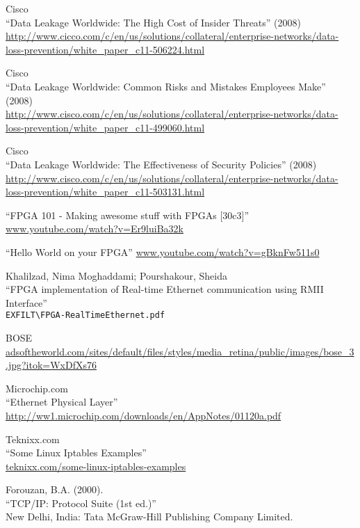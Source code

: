 \begin{thebibliography}{99}
{}
 Cisco \\
``Data Leakage Worldwide: The High Cost of Insider Threats'' (2008)\\
\url{http://www.cicco.com/c/en/us/solutions/collateral/enterprise-networks/data-loss-prevention/white_paper_c11-506224.html}

 Cisco\\
``Data Leakage Worldwide: Common Risks and Mistakes Employees Make'' (2008)\\
\url{http://www.cisco.com/c/en/us/solutions/collateral/enterprise-networks/data-loss-prevention/white_paper_c11-499060.html}

 Cisco\\
``Data Leakage Worldwide: The Effectiveness of Security Policies'' (2008)\\
\url{http://www.cisco.com/c/en/us/solutions/collateral/enterprise-networks/data-loss-prevention/white_paper_c11-503131.html}

 ``FPGA 101 - Making awesome stuff with FPGAs [30c3]''\\
\url{www.youtube.com/watch?v=Er9luiBa32k}

 ``Hello World on your FPGA''
\url{www.youtube.com/watch?v=gBknFw511s0}

 Khalilzad, Nima Moghaddami; Pourshakour, Sheida\\
``FPGA implementation of Real-time Ethernet communication using RMII Interface''\\
\verb|EXFILT\FPGA-RealTimeEthernet.pdf|

 BOSE\\
\url{adsoftheworld.com/sites/default/files/styles/media_retina/public/images/bose_3.jpg?itok=WxDfXs76}

 Microchip.com\\
``Ethernet Physical Layer''\\
\url{http://ww1.microchip.com/downloads/en/AppNotes/01120a.pdf}

 Teknixx.com\\
``Some Linux Iptables Examples''\\
\url{teknixx.com/some-linux-iptables-examples}

 Forouzan, B.A. (2000).\\
``TCP/IP: Protocol Suite (1st ed.)''\\
New Delhi, India: Tata McGraw-Hill Publishing Company Limited.


\end{thebibliography}

